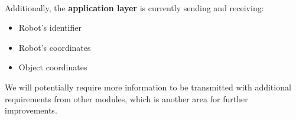 \paragraph*{}
Additionally, the \textbf{application layer} is currently sending and receiving:

\begin{itemize}
    \item Robot's identifier
    \item Robot's coordinates
    \item Object coordinates
\end{itemize}

We will potentially require more information to be transmitted with additional requirements from other modules, which is another area for further improvements.
